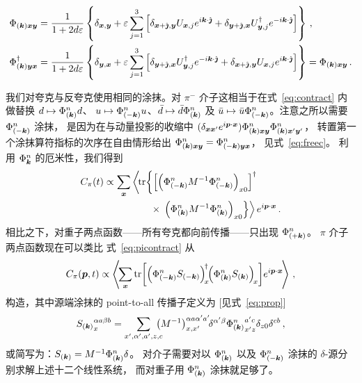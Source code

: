 \begin{align}
\Phi_{(\boldsymbol{k})\boldsymbol{x}\boldsymbol{y}}&=\frac{1}{1+2d\varepsilon}\left\{\delta_{\boldsymbol{x},\boldsymbol{y}}+
\varepsilon \sum_{j=1}^{3} \left[\delta_{\boldsymbol{x}+\hat{\boldsymbol{\jmath}},\boldsymbol{y}}
U_{\boldsymbol{x},j} e^{i\boldsymbol{k}\cdot\hat{\boldsymbol{\jmath}}}
+\delta_{\boldsymbol{y}+\hat{\boldsymbol{\jmath}},\boldsymbol{x}}U^{\dagger}_{\boldsymbol{y},j} e^{-i\boldsymbol{k}\cdot\hat{\boldsymbol{\jmath}}}
\right]\right\}\,,\nonumber\\
\Phi_{(\boldsymbol{k})\boldsymbol{y}\boldsymbol{x}}^{\dagger}
&=
\frac{1}{1+2d\varepsilon}\left\{\delta_{\boldsymbol{y},\boldsymbol{x}}+
\varepsilon \sum_{j= 1}^{3} \left[\delta_{\boldsymbol{y}+\hat{\boldsymbol{\jmath}},\boldsymbol{x}}
U_{\boldsymbol{y},j}^{\dagger} e^{-i\boldsymbol{k}\cdot\hat{\boldsymbol{\jmath}}}
+\delta_{\boldsymbol{x}+\hat{\boldsymbol{\jmath}},\boldsymbol{y}}U_{\boldsymbol{x},j} e^{i\boldsymbol{k}\cdot\hat{\boldsymbol{\jmath}}}
\right]\right\}
=\Phi_{(\boldsymbol{k})\boldsymbol{x}\boldsymbol{y}}\,.\label{eq:transpose}
\end{align}

我们对夸克与反夸克使用相同的涂抹。对 $\pi^-$ 介子这相当于在式~\eqref{eq:contract} 内做替换
$d\mapsto \Phi^n_{(\boldsymbol{k})}d$、
$u\mapsto \Phi^n_{(-\boldsymbol{k})}u$、$\bar{d}\mapsto \bar{d}\Phi^n_{(\boldsymbol{k})}$
及 $\bar{u}\mapsto \bar{u}\Phi^n_{(-\boldsymbol{k})}$。注意之所以需要 $\Phi^n_{(-\boldsymbol{k})}$ 涂抹，
是因为在与动量投影的收缩中
$(\delta_{\boldsymbol{x}\boldsymbol{x}'}e^{i\boldsymbol{p}\cdot\boldsymbol{x}})
\Phi^n_{(\boldsymbol{k})\boldsymbol{x}\boldsymbol{y}}\Phi^n_{(\boldsymbol{k})\boldsymbol{x}'\boldsymbol{y}'}$，
转置第一个涂抹算符指标的次序在自由情形给出
$\Phi^n_{(\boldsymbol{k})\boldsymbol{x}\boldsymbol{y}}=\Phi^n_{(-\boldsymbol{k})\boldsymbol{y}\boldsymbol{x}}$，
见式~\eqref{eq:freec}。
利用 $\Phi^n_{\boldsymbol{k}}$ 的厄米性，我们得到
\begin{align}
C_{\pi}(t)
\propto\sum_{\boldsymbol{x}}&\left\langle\!\mathop{\textmd{tr}}\nolimits\!\left\{\left[\left(\Phi^n_{(-\boldsymbol{k})}M^{-1}\Phi^n_{(-\boldsymbol{k})}\right)_{x0}\right]^{\dagger}\right.\right.\nonumber\\
&\qquad\times\left.\left.\left(\Phi^n_{(\boldsymbol{k})}M^{-1}\Phi^n_{(\boldsymbol{k})}\right)_{x0}
\right\}\right\rangle e^{i \boldsymbol{p}\cdot\boldsymbol{x}}\,.
\end{align}
相比之下，对重子两点函数——所有夸克都向前传播——只出现 $\Phi^n_{(+\boldsymbol{k})}$。
$\pi$ 介子两点函数现在可以类比
式~\eqref{eq:picontract} 从
\begin{equation}
C_{\pi}(\vect{p},t)\propto\left\langle\!\sum_{\vect{x}}\tr\!\left[
\left(\Phi^n_{(-\vect{k})}S_{(-\vect{k})}\right)^{\!\dagger}_{\!x}\!\!\left(
\Phi^n_{(\vect{k})}S_{(\vect{k})}\right)_{\!x}\right]\!e^{i\vect{p}\cdot\vect{x}}\!
\right\rangle\,,
\end{equation}
构造，其中源端涂抹的
point-to-all 传播子定义为 [见式~\eqref{eq:prop}]
\begin{equation}
{S_{(\ensuremath{\boldsymbol{k}})}}^{\alpha a \beta  b}_x=
\sum_{x',\alpha',a',z,c}\!\!\!\!\!\left(M^{-1}\right)^{\alpha a\alpha' a'}_{x,x'}\!\!\delta^{\alpha'\beta}
{\Phi^n_{(\boldsymbol{k})}}_{x'z}^{a'c}
\delta_{z0}\delta^{cb}\,,
\end{equation}
或简写为：$S_{(\boldsymbol{k})}=M^{-1}\Phi_{(\boldsymbol{k})}^n\delta$。
对介子需要对以 $\Phi_{(\boldsymbol{k})}^n$ 以及
$\Phi_{(-\boldsymbol{k})}^n$ 涂抹的 $\delta$-源分别求解上述十二个线性系统，
而对重子用
$\Phi_{(\boldsymbol{k})}^n$ 涂抹就足够了。

